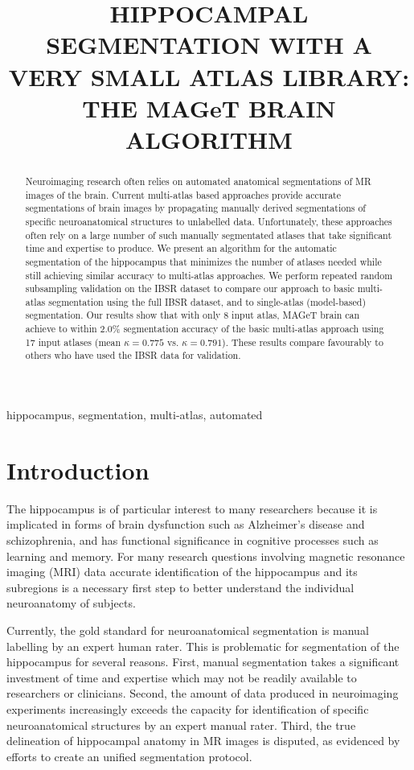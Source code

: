 \documentclass{article}\usepackage{graphicx, color}
\title{HIPPOCAMPAL SEGMENTATION WITH A VERY SMALL ATLAS LIBRARY: THE MAGeT
BRAIN ALGORITHM}
\begin{document}
\maketitle       

\begin{abstract}
Neuroimaging research often relies on automated anatomical segmentations of MR
images of the brain. Current multi-atlas based approaches provide accurate
segmentations of brain images by propagating manually derived segmentations of
specific neuroanatomical structures to unlabelled data. Unfortunately, these
approaches often rely on a large number of such manually segmentated atlases
that take significant time and expertise to produce. We present an algorithm
for the automatic segmentation of the hippocampus that minimizes the number of
atlases needed while still achieving similar accuracy to multi-atlas
approaches.  We perform repeated random subsampling validation on the IBSR
dataset to compare our approach to basic multi-atlas segmentation using
the full IBSR dataset, and to single-atlas (model-based) segmentation. Our
results show that with only 8 input atlas, MAGeT brain can achieve to within
2.0\% segmentation accuracy of the basic multi-atlas approach using 17
input atlases (mean $\kappa = 0.775$ vs.  $\kappa = 0.791$).  These results
compare favourably to others who have used the IBSR data for validation. 
\end{abstract}

\begin{keywords}
hippocampus, segmentation, multi-atlas, automated
\end{keywords}

\section{Introduction}
\label{sec:intro}

The hippocampus is of particular interest to many researchers because it is
implicated in forms of brain dysfunction such as Alzheimer's disease and
schizophrenia, and has functional significance in cognitive processes such as
learning and memory.  For many research questions involving magnetic resonance
imaging (MRI) data accurate identification of the hippocampus and its
subregions is a necessary first step to better understand the individual
neuroanatomy of subjects.  

Currently, the gold standard for neuroanatomical segmentation is manual
labelling by an expert human rater.  This is problematic for segmentation of
the hippocampus for several reasons.  First, manual segmentation takes a
significant investment of time and expertise \cite{Hammers2003} which may not
be readily available to researchers or clinicians.  Second, the amount of data
produced in neuroimaging experiments increasingly exceeds the capacity for
identification of specific neuroanatomical structures by an expert manual
rater.  Third, the true delineation of hippocampal anatomy in MR images is
disputed\cite{Geuze2004}, as evidenced by efforts to create an unified
segmentation protocol\cite{Jack2011}.  
\end{document}
